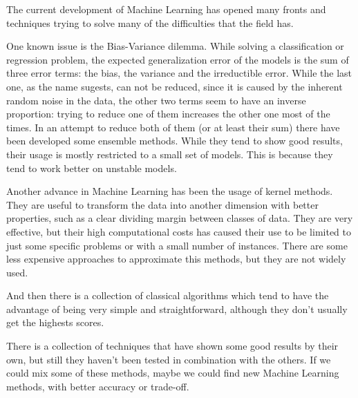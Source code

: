 \begin{pre-delivery}
  The current development of Machine Learning has opened many fronts and
  techniques trying to solve many of the difficulties that the field has.

  One known issue is the Bias-Variance dilemma. While solving a classification
  or regression problem, the expected generalization error of the models is the
  sum of three error terms: the bias, the variance and the irreductible error.
  While the last one, as the name sugests, can not be reduced, since it is
  caused by the inherent random noise in the data, the other two terms seem
  to have an inverse proportion: trying to reduce one of them increases the
  other one most of the times. In an attempt to reduce both of them (or at
  least their sum) there have been developed some ensemble methods. While they
  tend to show good results, their usage is mostly restricted to a small set of
  models. This is because they tend to work better on unstable
  models.

  Another advance in Machine Learning has been the usage of kernel methods. They
  are useful to transform the data into another dimension with better properties,
  such as a clear dividing margin between classes of data. They are very
  effective, but their high computational costs has caused their use to be limited to just
  some specific problems or with a small number of instances. There are some
  less expensive approaches to approximate this methods, but they are not
  widely used.

  And then there is a collection of classical algorithms which tend to have the
  advantage of being very simple and straightforward, although they don't
  usually get the highests scores.

  There is a collection of techniques that have shown some good results by their
  own, but still they haven't been tested in combination with the others. If we
  could mix some of these methods, maybe we could find new Machine Learning
  methods, with better accuracy or trade-off.

  

\end{pre-delivery}
